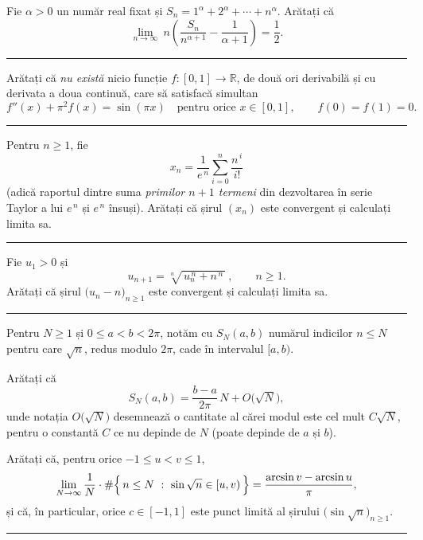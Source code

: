 Fie $\alpha>0$ un număr real fixat și $S_{n}=1^{\alpha}+2^{\alpha}+\cdots+n^{\alpha}$. Arătați că
\[ \lim_{n\to\infty}\ n\left(\frac{S_{n}}{n^{\alpha+1}}-\frac{1}{\alpha+1}\right)=\frac12 . \]
\vspace{1mm}\hrule

Arătați că \emph{nu există} nicio funcție $f:[0,1]\to\mathbb{R}$, de două ori derivabilă și cu derivata a doua continuă, care să satisfacă simultan
\[ f''(x)+\pi^{2}f(x)=\sin(\pi x)\quad\text{pentru orice }x\in[0,1],\qquad f(0)=f(1)=0 . \]
\vspace{1mm}\hrule

Pentru $n\ge1$, fie
\[ x_n=\frac{1}{e^{\,n}}\sum_{i=0}^{n}\frac{n^{\,i}}{i!} \]
(adică raportul dintre suma \emph{primilor $n+1$ termeni} din dezvoltarea în serie Taylor a lui $e^{\,n}$ și $e^{\,n}$ însuși). Arătați că șirul $(x_n)$ este convergent și calculați limita sa.
\vspace{1mm}\hrule

Fie $u_{1}>0$ și
\[ u_{n+1}=\sqrt[n]{\,u_{n}^{\,n}+n^{\,n}\,}\ ,\qquad n\ge1 . \]
Arătați că șirul $\bigl(u_{n}-n\bigr)_{n\ge1}$ este convergent și calculați limita sa.
\vspace{1mm}\hrule

Pentru $N\ge1$ și $0\le a<b<2\pi$, notăm cu $S_N(a,b)$ numărul indicilor $n\le N$ pentru care $\sqrt n$, redus modulo $2\pi$, cade în intervalul $[a,b)$.
\begin{parti}
  \item Arătați că
  \[ S_N(a,b)=\frac{b-a}{2\pi}\,N+O\bigl(\sqrt N\bigr) , \]
  unde notația $O\bigl(\sqrt N\bigr)$ desemnează o cantitate al cărei modul este cel mult $C\sqrt N$, pentru o constantă $C$ ce nu depinde de $N$ (poate depinde de $a$ și $b$).
  \item Arătați că, pentru orice $-1\le u<v\le1$,
  \[ \lim_{N\to\infty}\frac{1}{N}\cdot\#\Bigl\{\,n\le N\ :\ \sin\sqrt n\in[u,v)\,\Bigr\}=\frac{\arcsin v-\arcsin u}{\pi} , \]
  și că, în particular, orice $c\in[-1,1]$ este punct limită al șirului $\bigl(\sin\sqrt n\bigr)_{n\ge1}$.
\end{parti}
\vspace{1mm}\hrule
